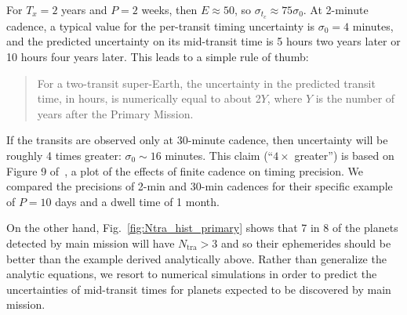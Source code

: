 For $T_x = 2$ years and $P = 2$ weeks, then $E \approx 50$, so $\sigma_{t_c}\approx 75\sigma_0$. 
At 2-minute cadence, a typical value for the per-transit timing uncertainty is $\sigma_0 = 4$ minutes, and the predicted uncertainty on its mid-transit time is 5 hours two years later or 10 hours four years later. This leads to a simple rule of thumb: %
\begin{quotation}
  For a two-transit super-Earth, the uncertainty in the predicted transit time, in hours, is numerically equal to about
  2$Y$, where $Y$ is the number of years after the Primary Mission.
\end{quotation}
If the transits are observed only at 30-minute cadence, then uncertainty will be roughly 4 times greater: $\sigma_0 \sim 16$ minutes. 
This claim (``$4\times$ greater'') is based on Figure 9 of~\citep{price_transit_2014}, a plot of the effects of finite cadence on timing precision. %
We compared the precisions of 2-min and 30-min cadences for their specific example of $P=10$ days and a dwell time of 1 month.

On the other hand, Fig.~\ref{fig:Ntra_hist_primary} shows that 7 in 8 of the planets detected by \tesss main mission will have $N_\mathrm{tra}>3$ and so their ephemerides should be better than the example derived analytically above.
Rather than generalize the analytic equations, we resort to numerical simulations in order to predict the uncertainties of mid-transit times for planets expected to be discovered by \tesss main mission.

